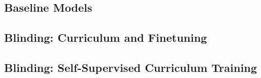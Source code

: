 
\subsection{Baseline Models}

\subsection{Blinding: Curriculum and Finetuning}

\subsection{Blinding: Self-Supervised Curriculum Training}
